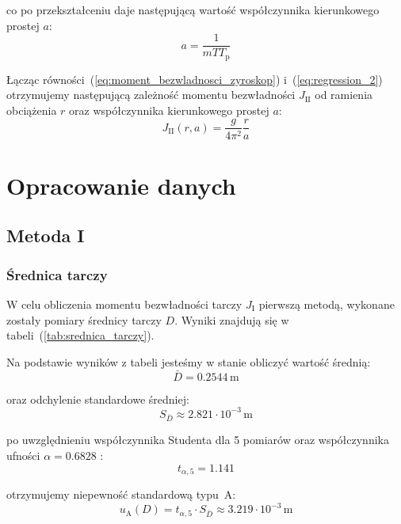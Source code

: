 \documentclass[twocolumn, a4paper, polish, 10pt]{article}
\begin{document}
co po przekształceniu daje następującą wartość współczynnika kierunkowego prostej $a$:
\begin{equation}
    a = \frac{1}{m T T_{\mathrm{p}}}
\label{eq:regression_2}
\end{equation}

Łącząc równości~(\ref{eq:moment_bezwladnosci_zyroskop}) i~(\ref{eq:regression_2}) otrzymujemy następującą zależność momentu bezwładności $J_{\mathrm{II}}$ od ramienia obciążenia $r$ oraz współczynnika kierunkowego prostej $a$:
\begin{equation}
    J_{\mathrm{II}}(r, a) = \frac{g}{4 \pi^2} \frac{r}{a}
\label{eq:moment_bezwladnosci_2}
\end{equation}

\section{Opracowanie danych}
\subsection{Metoda I}
\subsubsection{Średnica tarczy}
W celu obliczenia momentu bezwładności tarczy $J_{\mathrm{I}}$ pierwszą metodą, wykonane zostały pomiary średnicy tarczy $D$. Wyniki znajdują się w tabeli~(\ref{tab:srednica_tarczy}).



Na podstawie wyników z tabeli jesteśmy w stanie obliczyć wartość średnią:
\begin{displaymath}
    \bar{D} = 0.2544 \, \mathrm{m}
\end{displaymath}

oraz odchylenie standardowe średniej:
\begin{displaymath}
    S_{\bar{D}} \approx 2.821 \cdot 10^{-3} \, \mathrm{m}
\end{displaymath}

po uwzględnieniu współczynnika Studenta dla 5 pomiarów oraz współczynnika ufności $\alpha=0.6828$ \cite{smop_wyklad}:
\begin{displaymath}
    t_{\alpha, 5} = 1.141
\end{displaymath}

otrzymujemy niepewność standardową typu~A:
\begin{equation}
    u_{\mathrm{A}}(D) = t_{\alpha, 5} \cdot S_{\bar{D}} \approx 3.219 \cdot 10^{-3} \, \mathrm{m}
\label{eq:D_niepewnosc_A}
\end{equation}
\end{document}
